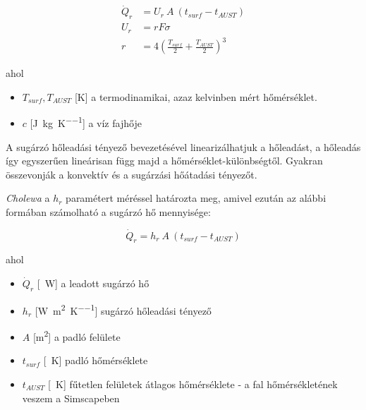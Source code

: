 \begin{equation} \label{eq_radiant_kilkis}
\begin{aligned}
\dot Q_{r} &= U_r ~ A~ \left(t_{surf}-t_{AUST}\right)\\[8pt]
U_r&=rF\sigma\\
r&=4 \left(\frac{T_{surf}}{2}+\frac{T_{AUST}}{2}\right)^3
\end{aligned}
\end{equation}


ahol
\begin{itemize}[itemsep=9pt,topsep=0pt,parsep=0pt,partopsep=0pt]
	\item[] $T_{surf}, T_{AUST}$ [\si{\kelvin}] a termodinamikai, azaz kelvinben mért hőmérséklet.
	\item[] $c$ [\si[per-mode = fraction]{\joule\per\kg\per\kelvin}] a víz fajhője
\end{itemize}

A sugárzó hőleadási tényező bevezetésével linearizálhatjuk a hőleadást, a hőleadás így egyszerűen lineárisan függ majd a hőmérséklet-különbségtől. Gyakran összevonják a konvektív és a sugárzási hőátadási tényezőt.

\textit{Cholewa} \cite{CHOLEWA2013599} a $h_r$ paramétert méréssel határozta meg, amivel ezután az alábbi formában számolható a sugárzó hő mennyisége:



\begin{equation} \label{eq_radiative_hr_linear}
\dot Q_{r} = h_r ~ A ~ \left(t_{surf}-t_{AUST}\right)
\end{equation}

ahol
\begin{itemize}[itemsep=3pt,topsep=0pt,parsep=0pt,partopsep=0pt]
	\item[] $\dot{Q}_{r}$ [\SI{}{\watt}] a leadott sugárzó hő
	\item[] $h_r$ [\si[per-mode = fraction]{\watt\per\meter\squared\per\kelvin}] sugárzó hőleadási tényező
	\item[] $A$ [\si{\metre\squared}] a padló felülete
	\item[] $t_{surf}$ [\SI{}{\kelvin}] padló hőmérséklete
	\item[] $t_{AUST}$ [\SI{}{\kelvin}] fűtetlen felületek átlagos hőmérséklete - a fal hőmérsékletének veszem a Simscapeben
\end{itemize}


